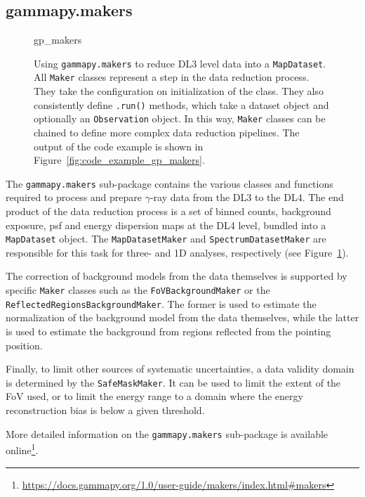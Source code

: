 \documentclass[longauth]{aa}
\newcommand{\code}[1]{\texttt{#1}}
\newcommand{\gammaray}{$\gamma$-ray\xspace}
\begin{document}
\subsection{gammapy.makers}
\label{ssec:gammapy-makers}
%
\begin{figure}
        \small
        {gp_makers}
        \caption{
        Using \code{gammapy.makers} to reduce DL3 level data into a
                \code{MapDataset}. All \code{Maker} classes represent 
                a step in the data reduction process. They take
        the configuration on initialization of the class. They 
                also consistently define \code{.run()} methods, which take
                a dataset object and optionally an \code{Observation} 
                object. In this way, \code{Maker} classes can be chained
                to define more complex data reduction pipelines. The output
                of the code example is shown in Figure~\ref{fig:code_example_gp_makers}.
    }
        \label{fig*:minted:gp_makers}
\end{figure}
%
The \code{gammapy.makers} sub-package contains the various classes and functions required
to process and prepare \gammaray data from the DL3 to the DL4.
The end product of the data reduction process is a set of binned counts,
background exposure, psf and energy dispersion maps at the DL4 level, bundled
into a \code{MapDataset} object.
The \code{MapDatasetMaker} and \code{SpectrumDatasetMaker} are
responsible for this task for three- and 1D analyses, respectively (see Figure~\ref{fig*:minted:gp_makers}).

The correction of background models from the data themselves is supported 
by specific \code{Maker} classes such as the \code{FoVBackgroundMaker} or the
\code{ReflectedRegionsBackgroundMaker}. The former is used to estimate the
normalization of the background model from the data themselves, while the
latter is used to estimate the background from regions reflected from the
pointing position.

Finally, to limit other sources of systematic uncertainties, a data validity
domain is determined by the \code{SafeMaskMaker}. It can be used to limit the
extent of the FoV used, or to limit the energy range to a domain
where the energy reconstruction bias is below a given threshold.

More detailed information on the \code{gammapy.makers} sub-package is available online\footnote{\url{https://docs.gammapy.org/1.0/user-guide/makers/index.html\#makers}}.
\end{document}
